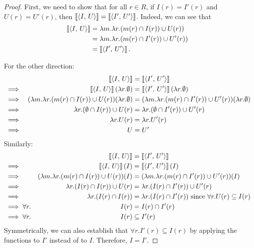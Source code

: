 \begin{proof}
   First, we need to show that for all $r\in R$, if $I(r)=I'(r)$ and $U(r)=U'(r)$, then $\left\llbracket\left\langle I,\,U\right\rangle\right\rrbracket=\left\llbracket\left\langle I',\,U'\right\rangle\right\rrbracket$. Indeed, we can see that
    \begin{align*}
        \left\llbracket\left\langle I,\,U\right\rangle\right\rrbracket
       & = \lambda m. \lambda r. (m(r) \cap I(r))\cup U(r))\\
       & = \lambda m. \lambda r. (m(r) \cap I'(r))\cup U'(r))\\
       & = 
        \left\llbracket\left\langle I',\,U'\right\rangle\right\rrbracket.
    \end{align*}

For the other direction:
\begin{align*}
&&
    \left\llbracket\left\langle I,\,U\right\rangle\right\rrbracket &= \left\llbracket\left\langle I',\,U'\right\rangle\right\rrbracket\\
&\implies &
    \left\llbracket\left\langle I,\,U\right\rangle\right\rrbracket(\lambda r. \emptyset) &= \left\llbracket\left\langle I',\,U'\right\rangle\right\rrbracket(\lambda r. \emptyset)\\
&\implies &
(\lambda m.\lambda r.(m(r)\cap I(r))\cup U(r))(\lambda r.\emptyset) &=
(\lambda m.\lambda r.(m(r)\cap I'(r))\cup U'(r))(\lambda r.\emptyset) \\
&\implies &
\lambda r.(\emptyset \cap I(r))\cup U(r) &=
\lambda r.(\emptyset \cap I'(r))\cup U'(r) \\
&\implies &
\lambda r.U(r) &=
\lambda r.U'(r) \\
&\implies &
U &=
U' \\
\end{align*}
Similarly:
\begin{align*}
&&
    \left\llbracket\left\langle I,\,U\right\rangle\right\rrbracket &= \left\llbracket\left\langle I',\,U'\right\rangle\right\rrbracket\\
&\implies &
\left\llbracket\left\langle I,\,U\right\rangle\right\rrbracket(I) &= \left\llbracket\left\langle I',\,U'\right\rangle\right\rrbracket(I)\\
&\implies &
(\lambda m.\lambda r.(m(r)\cap I(r))\cup U(r))(I) &=
(\lambda m.\lambda r.(m(r)\cap I'(r))\cup U'(r))(I) \\
&\implies &
\lambda r.(I(r) \cap I(r))\cup U(r) &=
\lambda r.(I(r) \cap I'(r))\cup U'(r) \\
&\implies &
\lambda r.(I(r) \cap I(r)) &=
\lambda r.(I(r) \cap I'(r)) \textrm{ since $\forall r.U(r) \subseteq I(r)$} \\
&\implies \forall r.&
I(r) &= I(r) \cap I'(r)\\
&\implies \forall r.&
I(r) &\subseteq I'(r)\\
\end{align*}
Symmetrically, we can also establish that $\forall r.I'(r) \subseteq I(r)$ by applying the functions to $I'$ instead of to $I$. Therefore, $I = I'$.
\end{proof}

